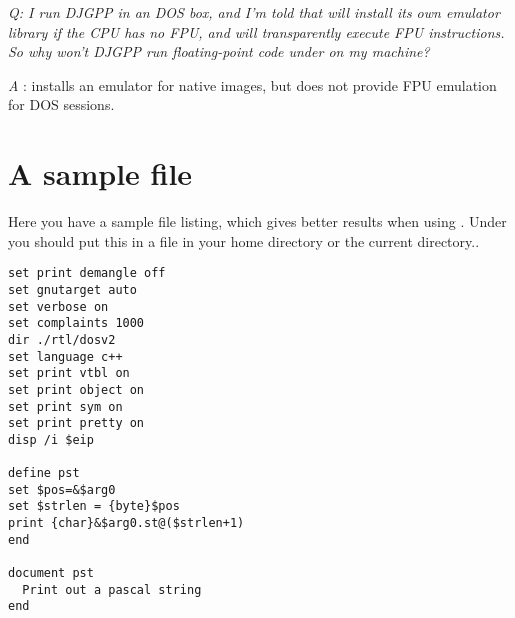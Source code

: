 \documentclass{book}
\begin{document}
{\em   Q: I run DJGPP in an \ostwo DOS box, and I'm told that \ostwo will install
   its own emulator library if the CPU has no FPU, and will transparently
   execute FPU instructions. So why won't DJGPP run floating-point code
   under \ostwo on my machine?
}

{\em   A} : \ostwo installs an emulator for native \ostwo images, but does not
   provide FPU emulation for DOS sessions.


\chapter{A sample  file}
\label{ch:GdbIniFile}

Here you have a sample  file listing, which gives better
results when using . Under \linux you should put this in a
 file in your home directory or the current directory..

\begin{verbatim}
set print demangle off
set gnutarget auto
set verbose on
set complaints 1000
dir ./rtl/dosv2
set language c++
set print vtbl on
set print object on
set print sym on
set print pretty on
disp /i $eip

define pst
set $pos=&$arg0
set $strlen = {byte}$pos
print {char}&$arg0.st@($strlen+1)
end

document pst
  Print out a pascal string
end
\end{verbatim}
\end{document}
